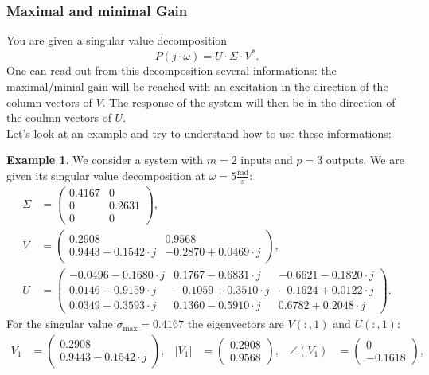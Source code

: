 \documentclass[a4paper,12 pt]{article}
\numberwithin{equation}{section}
\theoremstyle{definition}
\newtheorem{bsp}{Example}
\theoremstyle{remark}
\theoremstyle{definition}
\theoremstyle{definition}
\theoremstyle{definition}
\theoremstyle{remark}
\begin{document}
\subsubsection{Maximal and minimal Gain}
You are given a singular value decomposition 
\begin{equation}
P(j\cdot \omega)=U\cdot \Sigma \cdot V^*.
\end{equation}
One can read out from this decomposition several informations: the maximal/minial gain will be reached with an excitation in the direction of the column vectors of $V$. The response of the system will then be in the direction of the coulmn vectors of $U$.\\
Let's look at an example and try to understand how to use these informations:

\begin{bsp}
We consider a system with $m=2$ inputs and $p=3$ outputs. We are given its singular value decomposition at $\omega=5 \frac{\text{rad}}{\text{s}}$:
\begin{equation*}
\begin{split}
\Sigma&=\begin{pmatrix} 0.4167 & 0 \\ 0  & 0.2631 \\ 0 & 0 \end{pmatrix}, \\
V&=\begin{pmatrix} 0.2908 & 0.9568\\ 0.9443 - 0.1542\cdot j & -0.2870 + 0.0469\cdot j\end{pmatrix}, \\
U&= \begin{pmatrix}-0.0496 - 0.1680\cdot j &  0.1767 - 0.6831\cdot j & -0.6621 - 0.1820\cdot j\\ 0.0146 - 0.9159\cdot j &  -0.1059 + 0.3510\cdot j & -0.1624 + 0.0122\cdot j\\ 0.0349 - 0.3593\cdot j &  0.1360 - 0.5910\cdot j & 0.6782 + 0.2048\cdot j \end{pmatrix}.
\end{split}
\end{equation*}
For the singular value $\sigma_\text{max}=0.4167$ the eigenvectors are $V(:,1)$ and $U(:,1)$:
\begin{align*}
V_1&=\begin{pmatrix} 0.2908\\ 0.9443 - 0.1542\cdot j \end{pmatrix}, &  |V_1|&=\begin{pmatrix} 0.2908 \\ 0.9568 \end{pmatrix}, & \angle(V_1)&=\begin{pmatrix}0 \\ -0.1618\end{pmatrix}, \\

\end{align*}
\end{bsp}
\end{document}
